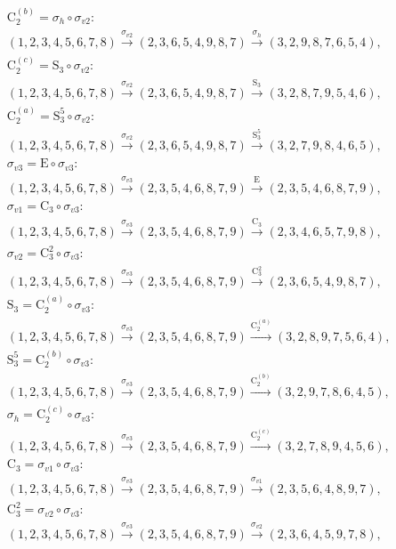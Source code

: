 \begin{align*}
& \mathrm{C}_{2}^{(b)} = \sigma_{h} \circ \sigma_{v2}:\; \\& (1,2,3,4,5,6,7,8) \xrightarrow{\sigma_{v2}} (2,3,6,5,4,9,8,7) \xrightarrow{\sigma_{h}} (3,2,9,8,7,6,5,4), \\
& \mathrm{C}_{2}^{(c)} = \mathrm{S}_{3} \circ \sigma_{v2}:\; \\& (1,2,3,4,5,6,7,8) \xrightarrow{\sigma_{v2}} (2,3,6,5,4,9,8,7) \xrightarrow{\mathrm{S}_{3}} (3,2,8,7,9,5,4,6), \\
& \mathrm{C}_{2}^{(a)} = \mathrm{S}_{3}^{5} \circ \sigma_{v2}:\; \\& (1,2,3,4,5,6,7,8) \xrightarrow{\sigma_{v2}} (2,3,6,5,4,9,8,7) \xrightarrow{\mathrm{S}_{3}^{5}} (3,2,7,9,8,4,6,5), \\
& \sigma_{v3} = \mathrm{E} \circ \sigma_{v3}:\; \\& (1,2,3,4,5,6,7,8) \xrightarrow{\sigma_{v3}} (2,3,5,4,6,8,7,9) \xrightarrow{\mathrm{E}} (2,3,5,4,6,8,7,9), \\
& \sigma_{v1} = \mathrm{C}_{3} \circ \sigma_{v3}:\; \\& (1,2,3,4,5,6,7,8) \xrightarrow{\sigma_{v3}} (2,3,5,4,6,8,7,9) \xrightarrow{\mathrm{C}_{3}} (2,3,4,6,5,7,9,8), \\
& \sigma_{v2} = \mathrm{C}_{3}^{2} \circ \sigma_{v3}:\; \\& (1,2,3,4,5,6,7,8) \xrightarrow{\sigma_{v3}} (2,3,5,4,6,8,7,9) \xrightarrow{\mathrm{C}_{3}^{2}} (2,3,6,5,4,9,8,7), \\
& \mathrm{S}_{3} = \mathrm{C}_{2}^{(a)} \circ \sigma_{v3}:\; \\& (1,2,3,4,5,6,7,8) \xrightarrow{\sigma_{v3}} (2,3,5,4,6,8,7,9) \xrightarrow{\mathrm{C}_{2}^{(a)}} (3,2,8,9,7,5,6,4), \\
& \mathrm{S}_{3}^{5} = \mathrm{C}_{2}^{(b)} \circ \sigma_{v3}:\; \\& (1,2,3,4,5,6,7,8) \xrightarrow{\sigma_{v3}} (2,3,5,4,6,8,7,9) \xrightarrow{\mathrm{C}_{2}^{(b)}} (3,2,9,7,8,6,4,5), \\
& \sigma_{h} = \mathrm{C}_{2}^{(c)} \circ \sigma_{v3}:\; \\& (1,2,3,4,5,6,7,8) \xrightarrow{\sigma_{v3}} (2,3,5,4,6,8,7,9) \xrightarrow{\mathrm{C}_{2}^{(c)}} (3,2,7,8,9,4,5,6), \\
& \mathrm{C}_{3} = \sigma_{v1} \circ \sigma_{v3}:\; \\& (1,2,3,4,5,6,7,8) \xrightarrow{\sigma_{v3}} (2,3,5,4,6,8,7,9) \xrightarrow{\sigma_{v1}} (2,3,5,6,4,8,9,7), \\
& \mathrm{C}_{3}^{2} = \sigma_{v2} \circ \sigma_{v3}:\; \\& (1,2,3,4,5,6,7,8) \xrightarrow{\sigma_{v3}} (2,3,5,4,6,8,7,9) \xrightarrow{\sigma_{v2}} (2,3,6,4,5,9,7,8), \\

\end{align*}
